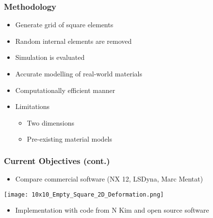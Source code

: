 \documentclass[serif, pdf]{beamer}
\begin{document}
\begin{frame}
    \frametitle{Methodology}
    \begin{itemize}
        \item<1-> Generate grid of square elements
        \item<2-> Random internal elements are removed
        \item<3-> Simulation is evaluated
        \item<4-> Accurate modelling of real-world materials
        \item<5-> Computationally efficient manner
        \item<6-> Limitations
        \changefontsizes{11pt}
        \begin{itemize}
            \item<7-> Two dimensions
            \item<8-> Pre-existing material models
        \end{itemize}
    \end{itemize}
\end{frame}


\begin{frame}
    \frametitle{Current Objectives (cont.)}
    \begin{itemize}
        \item<1-> Compare commercial software (NX 12, LSDyna, Marc Mentat)
    \end{itemize}
    \begin{center}
        \texttt{[image: 10x10\_Empty\_Square\_2D\_Deformation.png]}
    \end{center}
    \begin{itemize}
        \item<2-> Implementation with code from N Kim and open source software
    \end{itemize}
\end{frame}

\end{document}
